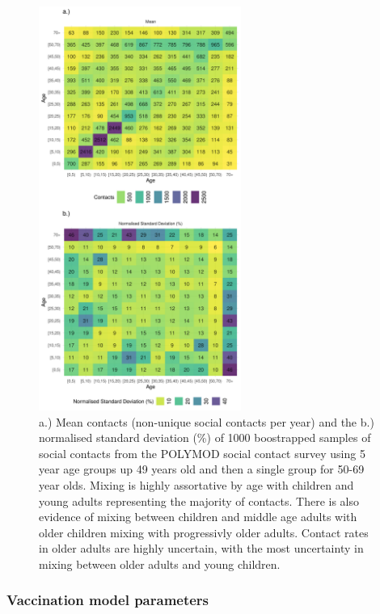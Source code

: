 \documentclass[11pt,twoside]{bristolthesis}
\begin{document}
  \begin{figure}
  
  {\centering \includegraphics[width=250px]{chapters/model-development/resources/figure/contact_matrix} 
  
  }
  
  \caption[a.) Mean contacts (non-unique social contacts per year) and the b.) normalised standard deviation (\%) of 1000 boostrapped samples of social contacts from the POLYMOD social contact survey using 5 year age groups up 49 years old and then a single group for 50-69 year olds.]{a.) Mean contacts (non-unique social contacts per year) and the b.) normalised standard deviation (\%) of 1000 boostrapped samples of  social contacts from the POLYMOD social contact survey using 5 year age groups up 49 years old and then a single group for 50-69 year olds. Mixing is highly assortative by age with children and young adults representing the majority of contacts. There is also evidence of mixing between children and middle age adults with older children mixing with progressivly older adults. Contact rates in older adults are highly uncertain, with the most uncertainty in mixing between older adults and young children.}\label{fig:contact-tile-plot}
  \end{figure}
  \hypertarget{vaccination-model-parameters}{%
  \subsubsection{Vaccination model parameters}\label{vaccination-model-parameters}}
  
\end{document}
